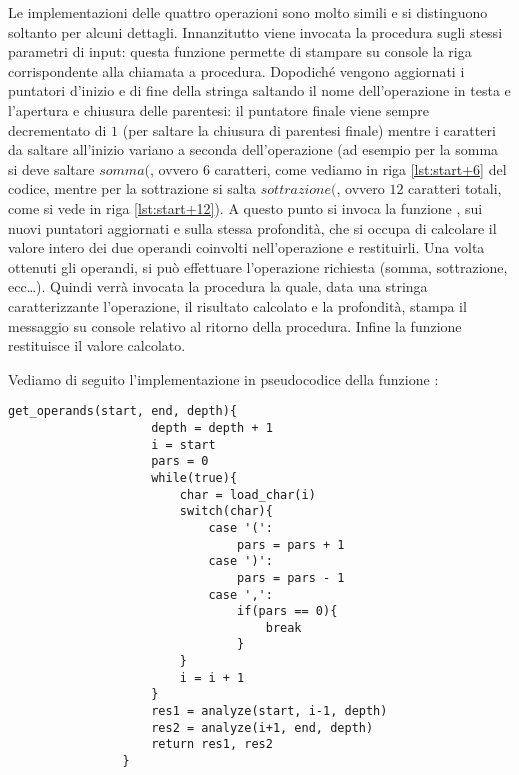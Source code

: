         Le implementazioni delle quattro operazioni sono molto simili e si distinguono soltanto per alcuni dettagli. Innanzitutto viene invocata la procedura  sugli stessi parametri di input: questa funzione permette di stampare su console la riga corrispondente alla chiamata a procedura. Dopodiché vengono aggiornati i puntatori d'inizio e di fine della stringa saltando il nome dell'operazione in testa e l'apertura e chiusura delle parentesi: il puntatore finale viene sempre decrementato di $1$ (per saltare la chiusura di parentesi finale) mentre i caratteri da saltare all'inizio variano a seconda dell'operazione (ad esempio per la somma si deve saltare $somma($, ovvero $6$ caratteri, come vediamo in riga \ref{lst:start+6} del codice, mentre per la sottrazione si salta $sottrazione($, ovvero $12$ caratteri totali, come si vede in riga \ref{lst:start+12}). A questo punto si invoca la funzione , sui nuovi puntatori aggiornati e sulla stessa profondità, che si occupa di calcolare il valore intero dei due operandi coinvolti nell'operazione e restituirli. Una volta ottenuti gli operandi, si può effettuare l'operazione richiesta (somma, sottrazione, ecc\dots). Quindi verrà invocata la procedura  la quale, data una stringa caratterizzante l'operazione, il risultato calcolato e la profondità, stampa il messaggio su console relativo al ritorno della procedura. Infine la funzione restituisce il valore calcolato.
        
        Vediamo di seguito l'implementazione in pseudocodice della funzione :
        
        \begin{center}
           	\begin{lstlisting}[language=pseudo, gobble=14]
                get_operands(start, end, depth){
                    depth = depth + 1
                    i = start
                    pars = 0
                    while(true){
                        char = load_char(i)
                        switch(char){
                            case '(':
                                pars = pars + 1
                            case ')':
                                pars = pars - 1
                            case ',':
                                if(pars == 0){
                                    break
                                }
                        }
                        i = i + 1
                    }
                    res1 = analyze(start, i-1, depth)
                    res2 = analyze(i+1, end, depth)
                    return res1, res2
                }\end{lstlisting}
        \end{center}
        
